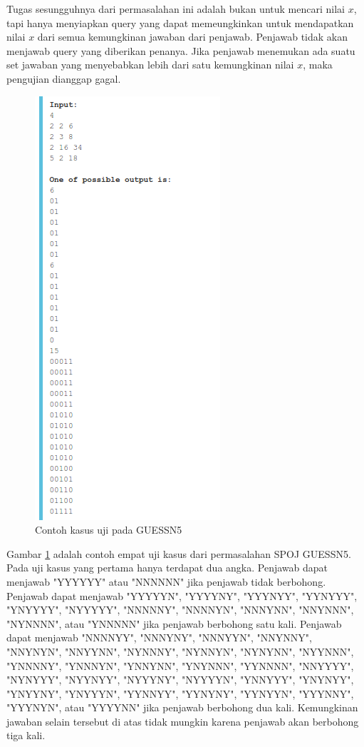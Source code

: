 \documentclass[conference,compsoc]{IEEEtran}
\begin{document}
Tugas sesungguhnya dari permasalahan ini adalah bukan untuk mencari nilai $x$, tapi hanya menyiapkan query yang dapat memeungkinkan untuk mendapatkan nilai $x$ dari semua kemungkinan jawaban dari penjawab. Penjawab tidak akan menjawab query yang diberikan penanya. Jika penjawab menemukan ada suatu set jawaban yang menyebabkan lebih dari satu kemungkinan nilai $x$, maka pengujian dianggap gagal.

\begin{figure}
\centering
\includegraphics[scale=0.6]{../img/example.png}
\caption{Contoh kasus uji pada GUESSN5}
\label{fig:guessn5_test_case}
\end{figure}

Gambar \ref{fig:guessn5_test_case} adalah contoh empat uji kasus dari permasalahan SPOJ GUESSN5. Pada uji kasus yang pertama hanya terdapat dua angka. Penjawab dapat menjawab "YYYYYY" atau "NNNNNN" jika penjawab tidak berbohong. Penjawab dapat menjawab "YYYYYN", "YYYYNY", "YYYNYY", "YYNYYY", "YNYYYY", "NYYYYY", "NNNNNY", "NNNNYN", "NNNYNN", "NNYNNN", "NYNNNN", atau "YNNNNN" jika penjawab berbohong satu kali. Penjawab dapat menjawab "NNNNYY", "NNNYNY", "NNNYYN", "NNYNNY", "NNYNYN", "NNYYNN", "NYNNNY", "NYNNYN", "NYNYNN", "NYYNNN", "YNNNNY", "YNNNYN", "YNNYNN", "YNYNNN", "YYNNNN", "NNYYYY", "NYNYYY", "NYYNYY", "NYYYNY", "NYYYYN", "YNNYYY", "YNYNYY", "YNYYNY", "YNYYYN", "YYNNYY", "YYNYNY", "YYNYYN", "YYYNNY", "YYYNYN", atau "YYYYNN" jika penjawab berbohong dua kali. Kemungkinan jawaban selain tersebut di atas tidak mungkin karena penjawab akan berbohong tiga kali.
\end{document}
